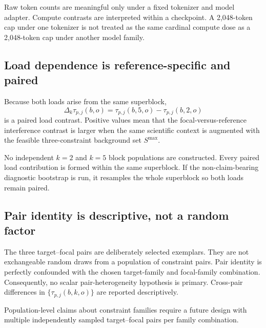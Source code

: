 \documentclass[11pt,a4paper]{article}
\begin{document}
Raw token counts are meaningful only under a fixed tokenizer and model adapter. Compute contrasts are interpreted within a checkpoint. A 2,048-token cap under one tokenizer is not treated as the same cardinal compute dose as a 2,048-token cap under another model family.

\subsection{Load dependence is reference-specific and paired}

Because both loads arise from the same superblock,
\[
\Delta_k\tau_{p,j}(b,o)
=
\tau_{p,j}(b,5,o)
-
\tau_{p,j}(b,2,o)
\]
is a paired load contrast. Positive values mean that the focal-versus-reference interference contrast is larger when the same scientific context is augmented with the feasible three-constraint background set $S^{\max}$.

No independent $k=2$ and $k=5$ block populations are constructed. Every paired load contribution is formed within the same superblock. If the non-claim-bearing diagnostic bootstrap is run, it resamples the whole superblock so both loads remain paired.

\subsection{Pair identity is descriptive, not a random factor}

The three target--focal pairs are deliberately selected exemplars. They are not exchangeable random draws from a population of constraint pairs. Pair identity is perfectly confounded with the chosen target-family and focal-family combination. Consequently, no scalar pair-heterogeneity hypothesis is primary. Cross-pair differences in $\{\tau_{p,j}(b,k,o)\}$ are reported descriptively.

Population-level claims about constraint families require a future design with multiple independently sampled target--focal pairs per family combination.
\end{document}
